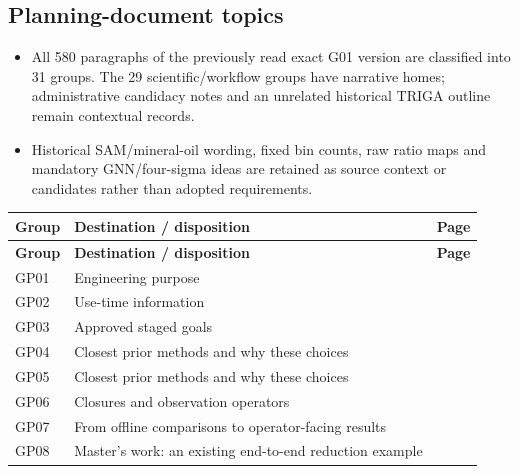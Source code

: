 \subsection{Planning-document topics}
\begin{itemize}[leftmargin=*]
\item All 580 paragraphs of the previously read exact G01 version are classified into 31 groups. The 29 scientific/workflow groups have narrative homes; administrative candidacy notes and an unrelated historical TRIGA outline remain contextual records.
\item Historical SAM/mineral-oil wording, fixed bin counts, raw ratio maps and mandatory GNN/four-sigma ideas are retained as source context or candidates rather than adopted requirements.
\end{itemize}
\begingroup\small
\begin{longtable}{@{}p{0.5in}p{4.80in}p{0.4in}@{}}
\textbf{Group} & \textbf{Destination / disposition} & \textbf{Page}\\\hline
\endfirsthead
\textbf{Group} & \textbf{Destination / disposition} & \textbf{Page}\\\hline
\endhead
GP01 & Engineering purpose & \hyperref[subsec:engineering-purpose]{\pageref*{subsec:engineering-purpose}}\\
GP02 & Use-time information & \hyperref[subsec:use-time-information]{\pageref*{subsec:use-time-information}}\\
GP03 & Approved staged goals & \hyperref[subsec:staged-research-goals]{\pageref*{subsec:staged-research-goals}}\\
GP04 & Closest prior methods and why these choices & \hyperref[subsec:closest-prior-methods-and-why-these-choices]{\pageref*{subsec:closest-prior-methods-and-why-these-choices}}\\
GP05 & Closest prior methods and why these choices & \hyperref[subsec:closest-prior-methods-and-why-these-choices]{\pageref*{subsec:closest-prior-methods-and-why-these-choices}}\\
GP06 & Closures and observation operators & \hyperref[subsec:closures-and-observation-operators]{\pageref*{subsec:closures-and-observation-operators}}\\
GP07 & From offline comparisons to operator-facing results & \hyperref[subsec:from-offline-comparisons-to-operator-facing-results]{\pageref*{subsec:from-offline-comparisons-to-operator-facing-results}}\\
GP08 & Master's work: an existing end-to-end reduction example & \hyperref[subsec:master-s-work-an-existing-end-to-end-reduction-example]{\pageref*{subsec:master-s-work-an-existing-end-to-end-reduction-example}}\\

\end{longtable}
